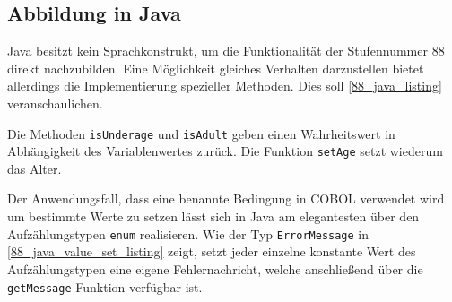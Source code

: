 
\subsection*{Abbildung in Java}
Java besitzt kein Sprachkonstrukt, um die Funktionalität der Stufennummer 88 direkt nachzubilden. Eine Möglichkeit gleiches Verhalten darzustellen bietet allerdings die Implementierung spezieller Methoden. Dies soll \autoref{88_java_listing} veranschaulichen.\\


Die Methoden \texttt{isUnderage} und \texttt{isAdult} geben einen Wahrheitswert in Abhängigkeit des Variablenwertes zurück. Die Funktion \texttt{setAge} setzt wiederum das Alter.\\


Der Anwendungsfall, dass eine benannte Bedingung in COBOL verwendet wird um bestimmte Werte zu setzen lässt sich in Java am elegantesten über den Aufzählungstypen \texttt{enum} realisieren. Wie der Typ \texttt{ErrorMessage} in \autoref{88_java_value_set_listing} zeigt, setzt jeder einzelne konstante Wert des Aufzählungstypen eine eigene Fehlernachricht, welche anschließend über die \texttt{getMessage}-Funktion verfügbar ist.\\